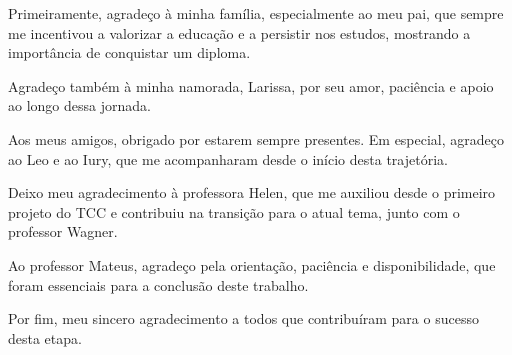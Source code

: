 \begin{agradecimentos}

Primeiramente, agradeço à minha família, especialmente ao meu pai, que sempre me incentivou a valorizar a educação e a persistir nos estudos, mostrando a importância de conquistar um diploma.

Agradeço também à minha namorada, Larissa, por seu amor, paciência e apoio ao longo dessa jornada.

Aos meus amigos, obrigado por estarem sempre presentes. Em especial, agradeço ao Leo e ao Iury, que me acompanharam desde o início desta trajetória.

Deixo meu agradecimento à professora Helen, que me auxiliou desde o primeiro projeto do TCC e contribuiu na transição para o atual tema, junto com o professor Wagner.

Ao professor Mateus, agradeço pela orientação, paciência e disponibilidade, que foram essenciais para a conclusão deste trabalho.

Por fim, meu sincero agradecimento a todos que contribuíram para o sucesso desta etapa.


\end{agradecimentos}